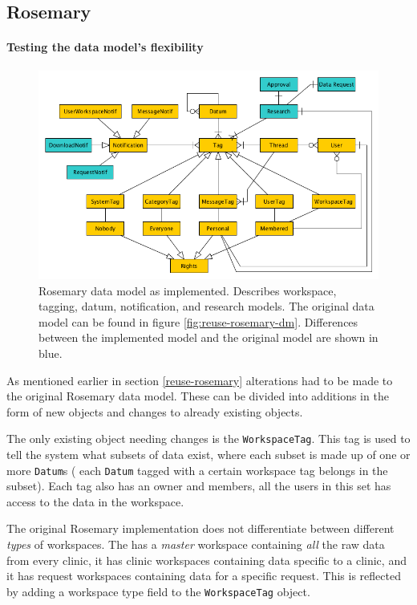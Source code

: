 \subsection{Rosemary}

\paragraph{Testing the data model's flexibility}
\begin{figure}[!b]
	\centering
	\includegraphics[width=1.0\linewidth]{images/datamodel-adapted}
	\caption{
		Rosemary data model as implemented.
		Describes workspace, tagging, datum, notification, and research models.
		The original data model can be found in figure \ref{fig:reuse-rosemary-dm}.
		Differences between the implemented model and the original model are shown in blue.
	}
	\label{fig:implementation-rosemary-dm}
\end{figure}

As mentioned earlier in section \ref{reuse-rosemary} alterations had to be made to the original Rosemary data model.
These can be divided into additions in the form of new objects and changes to already existing objects.

The only existing object needing changes is the {\tt WorkspaceTag}.
This tag is used to tell the system what subsets of data exist, where each subset is made up of one or more {\tt Datum}s (\ie{} each {\tt Datum} tagged with a certain workspace tag belongs in the subset).
Each tag also has an owner and members, all the users in this set has access to the data in the workspace.

The original Rosemary implementation does not differentiate between different \emph{types} of workspaces. 
The \ivfsystem{} has a \emph{master} workspace containing \emph{all} the raw data from every clinic, it has clinic workspaces containing data specific to a clinic, and it has request workspaces containing data for a specific request.
This is reflected by adding a workspace type field to the {\tt WorkspaceTag} object.

